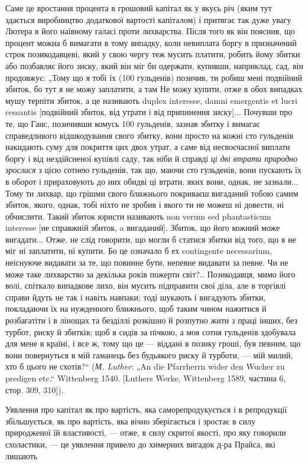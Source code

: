 Саме це вростання процента в грошовий капітал як у якусь
річ (яким тут здається виробництво додаткової вартості капіталом)
і притягає так дуже увагу Лютера в його наївному
галасі проти лихварства. Після того як він пояснив, що
процент можна б вимагати в тому випадку, коли невиплата
боргу в призначений строк позикодавцеві, який у свою чергу
теж мусить платити, робить йому збитки або позбавляє його
зиску, який він міг би одержати, купивши, наприклад, сад,
він продовжує: „Тому що я тобі їх (100 гульденів) позичив, ти
робиш мені подвійний збиток, бо тут я не можу заплатити,
а там Не можу купити, отже в обох випадках мушу терпіти
збиток, а це називають duplex interesse, damni emergentis et
lucri cessantis [подвійний збиток, від утрати і від припинення
зиску]... Почувши про те, що Ганс, позичивши комусь
100 гульденів, зазнав збитку і вимагає справедливого відшкодування
свого збитку, вони просто на кожні сто гульденів накидають
суму для покриття цих двох утрат, а саме від несвоєчасної
виплати боргу і від нездійсненої купівлі саду, так ніби
й справді \emph{ці дві втрати природно зрослися} з цією сотнею гульденів,
так що, маючи сто гульденів, вони пускають їх в оборот
і прираховують до них обидві ці втрати, яких вони, однак, не
зазнали... Тому ти лихвар, що грішми свого ближнього покриваєш
вигаданий тобою самим збиток, якого, однак, тобі ніхто
не зробив і якого ти не можеш ні довести, ні обчислити. Такий
збиток юристи називають non verum sed phantasticum interesse [не
справжній збиток, a вигаданий]. Збиток, що його кожний може вигадати...
Отже, не слід говорити, що могли б статися збитки від
того, що я не міг ні заплатити, ні купити. Бо це означало б ех
contingente necessarium, неіснуюче видавати за те, що повинне
бути, непевне видавати за певне. Чи не може таке лихварство за
декілька років пожерти світ?.. Позикодавця, мимо його волі, спіткало
випадкове лихо, він мусить підправити свої діла, але в торгівлі
справи йдуть не так і навіть навпаки; тоді шукають і вигадують
збитки, покладаючи їх на нужденного ближнього, щоб таким
чином нажитися й розбагатіти і в лінощах та безділлі розкішно
й розпутно жити з праці інших, без турбот, риску й збитків;
щоб я сидів за пічкою, а моя сотня гульденів здобувала для
мене в країні, і все ж, тому що це — віддані в позику гроші, був
певним, що вони повернуться в мій гаманець без будьякого
риску й турботи, — мій милий, хто б цього не схотів?“ (\emph{М. Luther}:
„An die Pfarrherrn wider den Wucher zu predigen etc.“ Wittenberg
1540. [Luthers Werke, Wittenberg 1589, частина 6, стор. 309,
310]).

Уявлення про капітал як про вартість, яка саморепродукується
і в репродукції збільшується, як про вартість, яка вічно
зберігається і зростає в силу природженої їй властивості, —
отже, в силу скритої якості, про яку говорили схоластики, — це
уявлення привело до химерних вигадок д-ра Прайса, які лишають
\parbreak{}  %
